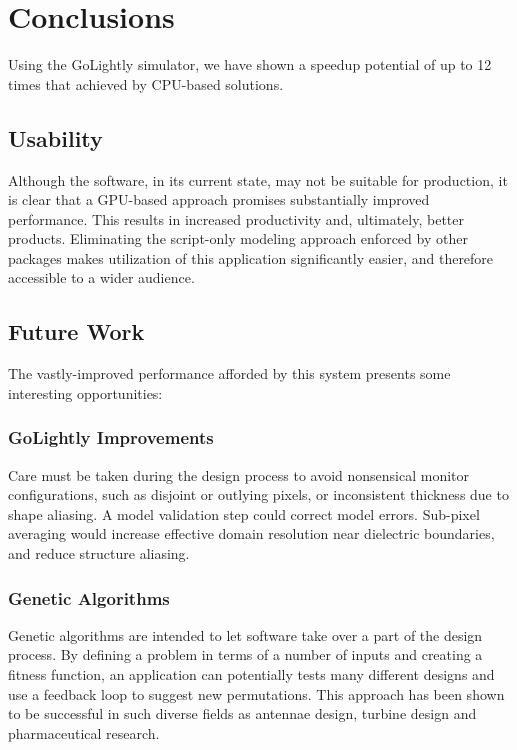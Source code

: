 \chapter{Conclusions} \label{ch:conclusions}

Using the GoLightly simulator, we have shown a speedup potential of up to 12 times that achieved by CPU-based solutions.

\section{Usability}

Although the software, in its current state, may not be suitable for production, it is clear that a GPU-based approach promises substantially improved performance. This results in increased productivity and, ultimately, better products. Eliminating the script-only modeling approach enforced by other packages makes utilization of this application significantly easier, and therefore accessible to a wider audience.

\section{Future Work}

The vastly-improved performance afforded by this system presents some interesting opportunities:

\subsection{GoLightly Improvements}

Care must be taken during the design process to avoid nonsensical monitor configurations, such as disjoint or outlying pixels, or inconsistent thickness due to shape aliasing. A model validation step could correct model errors. Sub-pixel averaging would increase effective domain resolution near dielectric boundaries, and reduce structure aliasing. 

\subsection{Genetic Algorithms}
Genetic algorithms\cite{Mitchell:1998:IGA:522098}\cite{Goldberg:1989:GAS:534133}  are intended to let software take over a part of the design process. By defining a problem in terms of a number of inputs and creating a fitness function, an application can potentially tests many different designs and use a feedback loop to suggest new permutations. This approach has been shown to be successful in such diverse fields as antennae design\cite{globus2006automated}, turbine design\cite{MOSETTI1994105} and pharmaceutical research\cite{Chi:2009:MLG:1651932.1652161}. 

